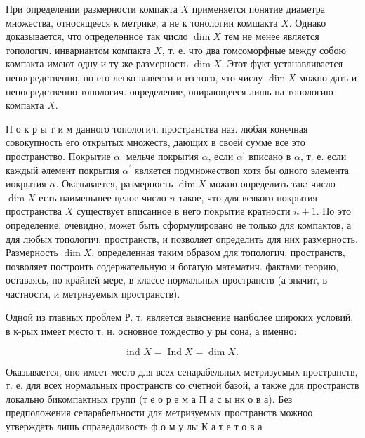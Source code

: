 \documentclass[10pt]{article}
\begin{document}
При определении размерности компакта $X$ применяется понятие диаметра множества, относящееся к метрике, а не к тонологии комшакта $X$. Однако доказывается, что определөнное так число $\operatorname{dim} X$ тем не менее является топологич. инвариантом компакта $X$, т. е. что два гомсоморфные между собою компакта имеют одну и ту же размерность $\operatorname{dim} X$. Этот фұкт устанавливается непосредственно, но его легко вывести и из того, что числу $\operatorname{dim} X$ можно дать и непосредственно топологич. определение, опирающееся лишь на топологию компакта $X$.



П о к р ы т и м данного топологич. пространства наз. любая конечная совокупность его открытых множеств, дающих в своей сумме все это пространство. Покрытие $\alpha^{\prime}$ мельче покрытия $\alpha$, если $\alpha^{\prime}$ вписано в $\alpha$, т. е. если каждый әлемент покрытия $\alpha^{\prime}$ является подмножествоп хотя бы одного элемента иокрытия $\alpha$. Оказывается, размерность $\operatorname{dim} X$ можно определить так: число $\operatorname{dim} X$ есть наименьшее целое число $n$ такое, что для всякого покрытия пространства $X$ существует вписанное в него покрытие кратности $n+1$. Но это определение, очевидно, может быть сформулировано не только для компактов, а для любых топологич. пространств, и позволяет определить для них размерность. Размерность $\operatorname{dim} X$, определенная таким образом для топологич. пространств, позволяет построить содержательную и богатую математич. фактами теорию, оставаясь, по крайней мере, в классе нормальных пространств (а значит, в частности, и метризуемых пространств).



Одной из главных проблем Р. т. является выяснение наиболее широких условий, в к-рых имеет место т. н. основное тождество у ры сона, а именно:



\[

\text { ind } X=\operatorname{Ind} X=\operatorname{dim} X \text {. }

\]



Оказывается, оно имеет место для всех сепарабельных метризуемых пространств, т. е. для всех нормальных пространств со счетной базой, а также для пространств локально бикомпактных групп (т е о р е м а П а с ы нк о в а). Без предположения сепарабельности для метризуемых пространств можноо утверждать лишь справедливость ф о м у лы $К$ а т е т о в а
\end{document}
